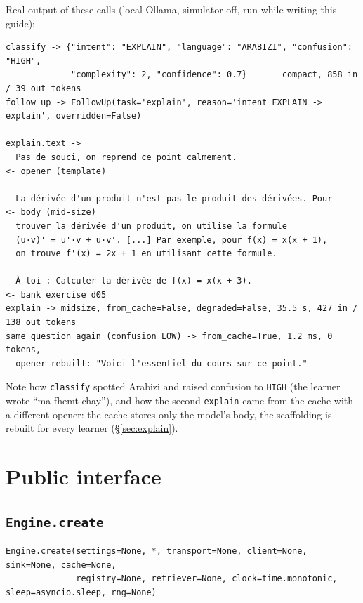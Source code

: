 \documentclass[11pt,a4paper]{article}
\renewcommand{\_}{\origus\allowbreak}
\begin{document}
Real output of these calls (local Ollama, simulator off, run while writing this guide):

\begin{lstlisting}[style=plain]
classify -> {"intent": "EXPLAIN", "language": "ARABIZI", "confusion": "HIGH",
             "complexity": 2, "confidence": 0.7}       compact, 858 in / 39 out tokens
follow_up -> FollowUp(task='explain', reason='intent EXPLAIN -> explain', overridden=False)

explain.text ->
  Pas de souci, on reprend ce point calmement.                       <- opener (template)

  La dérivée d'un produit n'est pas le produit des dérivées. Pour     <- body (mid-size)
  trouver la dérivée d'un produit, on utilise la formule
  (u·v)' = u'·v + u·v'. [...] Par exemple, pour f(x) = x(x + 1),
  on trouve f'(x) = 2x + 1 en utilisant cette formule.

  À toi : Calculer la dérivée de f(x) = x(x + 3).                    <- bank exercise d05
explain -> midsize, from_cache=False, degraded=False, 35.5 s, 427 in / 138 out tokens
same question again (confusion LOW) -> from_cache=True, 1.2 ms, 0 tokens,
  opener rebuilt: "Voici l'essentiel du cours sur ce point."
\end{lstlisting}

Note how \texttt{classify} spotted Arabizi and raised confusion to \texttt{HIGH} (the learner wrote
``ma fhemt chay''), and how the second \texttt{explain} came from the cache with a different opener: the
cache stores only the model's body, the scaffolding is rebuilt for every learner (§\ref{sec:explain}).

\section{Public interface}
\label{sec:api}

\subsection{\texttt{Engine.create}}

\begin{lstlisting}
Engine.create(settings=None, *, transport=None, client=None, sink=None, cache=None,
              registry=None, retriever=None, clock=time.monotonic, sleep=asyncio.sleep, rng=None)
\end{lstlisting}
\end{document}
